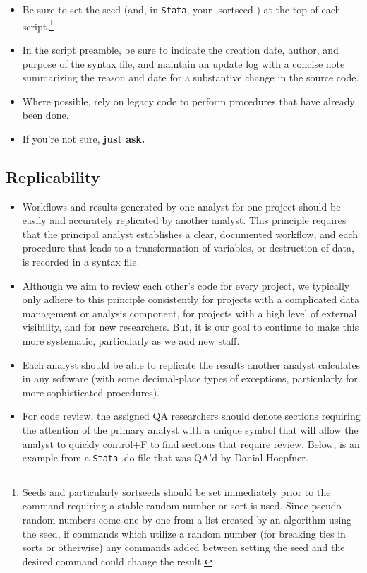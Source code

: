 \begin{itemize}
	\item Be sure to set the seed (and, in \texttt{Stata}, your -sortseed-) at the top of each script.\footnote{Seeds and particularly sortseeds should be set immediately prior to the command requiring a stable random number or sort is used. Since pseudo random numbers come one by one from a list created by an algorithm using the seed, if commands which utilize a random number (for breaking ties in sorts or otherwise) any commands added between setting the seed and the desired command could change the result.}
	\item In the script preamble, be sure to indicate the creation date, author, and purpose of the syntax file, and maintain an update log with a concise note summarizing the reason and date for a substantive change in the source code.
	\item Where possible, rely on legacy code to perform procedures that have already been done.
	\item If you're not sure, \bf{just ask}.
\end{itemize}

\subsection{Replicability}
\begin{itemize}
	\item Workflows and results generated by one analyst for one project should be easily and accurately replicated by another analyst. This principle requires that the principal analyst establishes a clear, documented workflow, and each procedure that leads to a transformation of variables, or destruction of data, is recorded in a syntax file.
	\item Although we aim to review each other's code for every project, we typically only adhere to this principle consistently for projects with a complicated data management or analysis component, for projects with a high level of external visibility, and for new researchers. But, it is our goal to continue to make this more systematic, particularly as we add new staff.
	\item Each analyst should be able to replicate the results another analyst calculates in any software (with some decimal-place types of exceptions, particularly for more sophisticated procedures).
	\item For code review, the assigned QA researchers should denote sections requiring the attention of the primary analyst with a unique symbol that will allow the analyst to quickly control+F to find sections that require review. Below, is an example from a \texttt{Stata} .do file that was QA'd by Danial Hoepfner.
\end{itemize}

